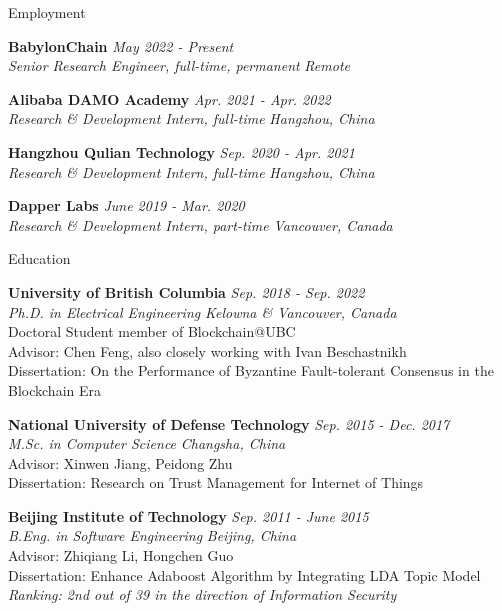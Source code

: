\documentclass{resume} %
\begin{document}

\begin{rSection}{Employment}

{\bf BabylonChain} \hfill {\em May 2022 - Present} \\ 
{\em Senior Research Engineer, full-time, permanent} \hfill {\em Remote}

{\bf Alibaba DAMO Academy} \hfill {\em Apr. 2021 - Apr. 2022} \\ 
{\em Research \& Development Intern, full-time} \hfill {\em Hangzhou, China}

{\bf Hangzhou Qulian Technology} \hfill {\em Sep. 2020 - Apr. 2021} \\ 
{\em Research \& Development Intern, full-time} \hfill {\em Hangzhou, China}

{\bf Dapper Labs} \hfill {\em June 2019 - Mar. 2020} \\ 
{\em Research \& Development Intern, part-time} \hfill {\em Vancouver, Canada}

\end{rSection}

\begin{rSection}{Education}

{\bf University of British Columbia} \hfill {\em Sep. 2018 - Sep. 2022} \\ 
{\em Ph.D. in Electrical Engineering} \hfill {\em Kelowna \& Vancouver, Canada}\\
Doctoral Student member of Blockchain@UBC \\
Advisor: Chen Feng, also closely working with Ivan Beschastnikh\\
Dissertation: On the Performance of Byzantine Fault-tolerant Consensus in the Blockchain Era \smallskip

{\bf National University of Defense Technology} \hfill {\em Sep. 2015 - Dec. 2017} \\ 
{\em M.Sc. in Computer Science} \hfill {\em Changsha, China}\\
Advisor: Xinwen Jiang, Peidong Zhu\\
Dissertation: Research on Trust Management for Internet of Things \smallskip

{\bf Beijing Institute of Technology} \hfill {\em Sep. 2011 - June 2015} \\ 
{\em B.Eng. in Software Engineering} \hfill {\em Beijing, China}\\
Advisor: Zhiqiang Li, Hongchen Guo\\
Dissertation: Enhance Adaboost Algorithm by Integrating LDA Topic Model\\
\em Ranking: 2nd out of 39 in the direction of Information Security

\end{rSection}
\end{document}
